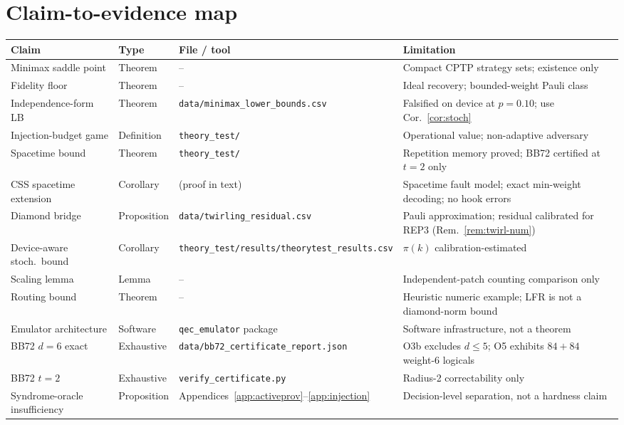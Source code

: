 \documentclass[11pt,a4paper]{article}
\begin{document}
\section*{Claim-to-evidence map}
\begin{table}[H]\centering\scriptsize
\setlength{\tabcolsep}{3pt}
\renewcommand{\arraystretch}{1.08}
\begin{tabularx}{\textwidth}{@{}p{3.1cm}p{1.7cm}X p{2.9cm}@{}}
\toprule Claim & Type & File / tool & Limitation \\\midrule
Minimax saddle point & Theorem & -- & Compact CPTP strategy sets; existence only \\
Fidelity floor & Theorem & -- & Ideal recovery; bounded-weight Pauli class \\
Independence-form LB & Theorem & \texttt{data/minimax\_lower\_bounds.csv} & Falsified on device at $p{=}0.10$; use Cor.~\ref{cor:stoch} \\
Injection-budget game & Definition & \texttt{theory\_test/} & Operational value; non-adaptive adversary \\
Spacetime bound & Theorem & \texttt{theory\_test/} & Repetition memory proved; BB72 certified at $t{=}2$ only \\
CSS spacetime extension & Corollary & (proof in text) & Spacetime fault model; exact min-weight decoding; no hook errors \\
Diamond bridge & Proposition & \texttt{data/twirling\_residual.csv} & Pauli approximation; residual calibrated for REP3 (Rem.~\ref{rem:twirl-num}) \\
Device-aware stoch.\ bound & Corollary & \texttt{theory\_test/results/theorytest\_results.csv} & $\pi(k)$ calibration-estimated \\
Scaling lemma & Lemma & -- & Independent-patch counting comparison only \\
Routing bound & Theorem & -- & Heuristic numeric example; LFR is not a diamond-norm bound \\
Emulator architecture & Software & \texttt{qec\_emulator} package & Software infrastructure, not a theorem \\
BB72 $d=6$ exact & Exhaustive & \texttt{data/bb72\_certificate\_report.json} & O3b excludes $d\le5$; O5 exhibits $84+84$ weight-6 logicals \\
BB72 $t=2$ & Exhaustive & \texttt{verify\_certificate.py} & Radius-2 correctability only \\
Syndrome-oracle insufficiency & Proposition & Appendices~\ref{app:activeprov}--\ref{app:injection} & Decision-level separation, not a hardness claim \\

\end{tabularx}
\end{table}
\end{document}
